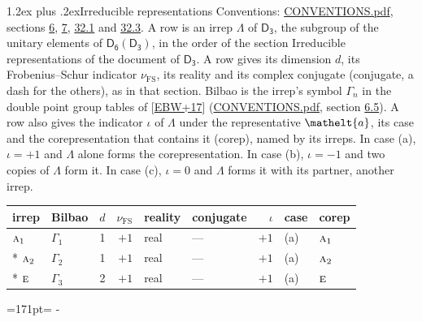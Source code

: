 \documentclass[10pt,a4paper]{article}
\makeatletter
\renewcommand\section{\@startsection{section}{1}{\z@}{-3ex plus -1ex minus -.2ex}%
  {1.2ex plus .2ex}{\normalfont\large\sffamily\bfseries\color{parttitle}}}
\newcommand{\needspace}[1]{\par\penalty-100\begingroup\dimen0=#1\relax\dimen2=\pagegoal
  \advance\dimen2-\pagetotal\ifdim\dimen0>\dimen2\relax\ifdim\dimen2>0pt\vfil\break\fi\fi
  \endgroup}
\numberwithin{equation}{section}
\newcommand{\eltfont}[1]{{\let\sigma\eltsigma\mathelt{#1}}}
\newcommand{\grp}[1]{\mathsf{#1}}
\newcommand{\irr}[1]{\text{\normalfont\scshape #1}}
\newcommand{\elt}[1]{\eltfont{#1}}
\newcommand{\fsind}{\nu_{\mathrm{FS}}}
\makeatother
\begin{document}
\section{Irreducible representations}\label{s:irreps}
Conventions: \href{../../CONVENTIONS.pdf}{CONVENTIONS.pdf}, sections \href{../../../rotation/CONVENTIONS.pdf\#conv.6}{6}, \href{../../../rotation/CONVENTIONS.pdf\#conv.7}{7}, \href{../../CONVENTIONS.pdf\#conv.32.1}{32.1} and \href{../../CONVENTIONS.pdf\#conv.32.3}{32.3}.
\leavevmode\label{n:irrep.Delta}A row is an irrep $\Lambda$ of $\grp{D_{3}}$, the subgroup of the unitary elements of $\grp{D_{6}}(\grp{D_{3}})$, in the order of the section Irreducible representations of the document of \href{../../../rotation/data/pdf/D3.pdf}{$\grp{D_{3}}$}. \label{n:index.dimension}\label{n:index.frobenius}\label{n:head.irrep}\label{n:head.reality}\label{n:head.conjugate}A row gives its dimension $d$, its Frobenius--Schur indicator $\fsind$, its reality and its complex conjugate (conjugate, a dash for the others), as in that section. \label{n:head.bilbao}\label{n:irrep.alias.gamma}Bilbao is the irrep's symbol $\Gamma_n$ in the double point group tables of [\href{../../../REFERENCES.pdf\#ref.EBW+17}{EBW+17}] (\href{../../CONVENTIONS.pdf}{CONVENTIONS.pdf}, section \href{../../../rotation/CONVENTIONS.pdf\#conv.6.5}{6.5}). \label{n:head.case.corep}\label{n:head.corep}A row also gives the indicator $\iota$ of $\Lambda$ under the representative $\elt{a}$, its case and the corepresentation that contains it (corep), named by its irreps. In case (a), $\iota = +1$ and $\Lambda$ alone forms the corepresentation. In case (b), $\iota = -1$ and two copies of $\Lambda$ form it. In case (c), $\iota = 0$ and $\Lambda$ forms it with its partner, another irrep.
\setlength{\emergencystretch}{2em}\par\setlength{\emergencystretch}{0pt}
{\small\renewcommand{\arraystretch}{1.25}\setlength{\tabcolsep}{4pt}\begin{longtable}{@{}llrrllrll@{}}\toprule
irrep & Bilbao & $d$ & $\fsind$ & reality & conjugate & $\iota$ & case & corep\\\midrule\endhead
\bottomrule\endfoot\endlastfoot
$\irr{a}_{1}$ & $\Gamma_{1}$ & 1 & $+1$ & real & --- & $+1$ & (a) & $\irr{a}_{1}$\\*
$\irr{a}_{2}$ & $\Gamma_{2}$ & 1 & $+1$ & real & --- & $+1$ & (a) & $\irr{a}_{2}$\\*
$\irr{e}$ & $\Gamma_{3}$ & 2 & $+1$ & real & --- & $+1$ & (a) & $\irr{e}$\\
\bottomrule\end{longtable}}
\needspace{171pt}
\end{document}
